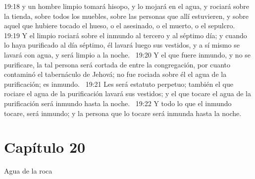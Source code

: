 19:18 y un hombre limpio tomará hisopo, y lo mojará en el agua, y rociará sobre la tienda, sobre todos los muebles, sobre las personas que allí estuvieren, y sobre aquel que hubiere tocado el hueso, o el asesinado, o el muerto, o el sepulcro.  
19:19 Y el limpio rociará sobre el inmundo al tercero y al séptimo día; y cuando lo haya purificado al día séptimo, él lavará luego sus vestidos, y a sí mismo se lavará con agua, y será limpio a la noche.  
19:20 Y el que fuere inmundo, y no se purificare, la tal persona será cortada de entre la congregación, por cuanto contaminó el tabernáculo de Jehová; no fue rociada sobre él el agua de la purificación; es inmundo.  
19:21 Les será estatuto perpetuo; también el que rociare el agua de la purificación lavará sus vestidos; y el que tocare el agua de la purificación será inmundo hasta la noche.  
19:22 Y todo lo que el inmundo tocare, será inmundo; y la persona que lo tocare será inmunda hasta la noche.  
\section*{Capítulo 20}
Agua de la roca  

